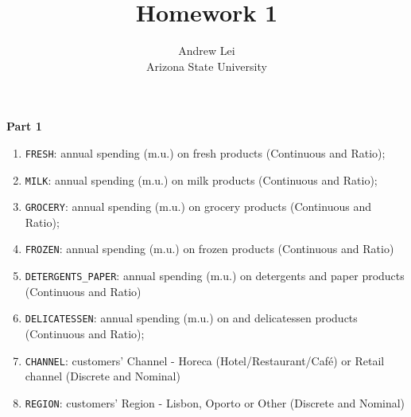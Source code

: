 \documentclass{article}
\begin{document}
	\setlength{\droptitle}{-10em}
	\title{Homework 1}
	\author{Andrew Lei\\Arizona State University}
	\maketitle
	
	\noindent
	\textbf{Part 1}
	\begin{enumerate}
		\item \texttt{FRESH}: annual spending (m.u.) on fresh products (Continuous and Ratio); 
		\item \texttt{MILK}: annual spending (m.u.) on milk products (Continuous and Ratio); 
		\item \texttt{GROCERY}: annual spending (m.u.) on grocery products (Continuous and Ratio); 
		\item \texttt{FROZEN}: annual spending (m.u.) on frozen products (Continuous and Ratio) 
		\item \texttt{DETERGENTS\_PAPER}: annual spending (m.u.) on detergents and paper products (Continuous and Ratio)
		\item \texttt{DELICATESSEN}: annual spending (m.u.) on and delicatessen products (Continuous and Ratio); 
		\item \texttt{CHANNEL}: customers' Channel - Horeca (Hotel/Restaurant/Caf\'{e}) or Retail channel (Discrete and Nominal) 
		\item \texttt{REGION}: customers' Region - Lisbon, Oporto or Other (Discrete and Nominal) 
	\end{enumerate}
	
\end{document}
